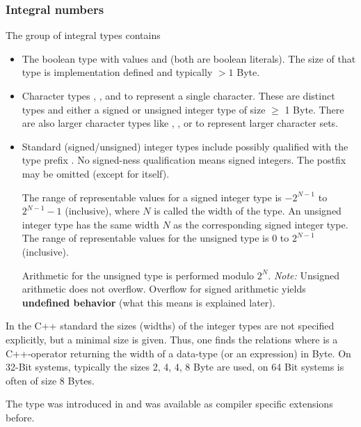 \subsubsection{Integral numbers}
The group of integral types contains
\begin{itemize}
  \item The boolean type  with values  and  (both are boolean literals). The size of that type is implementation defined and typically $> 1$ Byte.

  \item Character types , , and  to represent a single character. These are distinct types and either a signed or unsigned integer type of size $\geq$ 1 Byte. There are also larger character types like , , or  to represent larger character sets.

  \item Standard (signed/unsigned) integer types include  possibly qualified with the type prefix . No signed-ness qualification means signed integers. The postfix  may be omitted (except for  itself).

  The range of representable values for a signed integer type is $-2^{N-1}$ to $2^{N-1} - 1$ (inclusive), where $N$ is called the width of the type. An unsigned integer type has the same width $N$ as the corresponding signed integer type. The range of representable values for the unsigned type is $0$ to $2^{N-1}$ (inclusive).

  Arithmetic for the unsigned type is performed modulo $2^N$. \emph{Note:} Unsigned arithmetic does not overflow. Overflow for signed arithmetic yields \textbf{undefined behavior} (what this means is explained later).
\end{itemize}

In the C++ standard the sizes (widths) of the integer types are not specified explicitly, but a minimal size is given. Thus, one finds the relations
%
%
where  is a C++-operator returning the width of a data-type (or an expression) in Byte. On 32-Bit systems, typically the sizes 2, 4, 4, 8 Byte are used, on 64 Bit systems  is often of size 8 Bytes.

The\marginpar{[\cxx{11}]} type  was introduced in  and was available as compiler specific extensions before.

